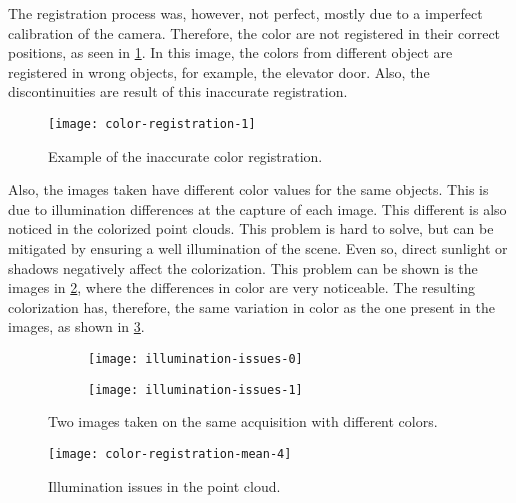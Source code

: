 The registration process was, however, not perfect, mostly due to a imperfect calibration of the camera. Therefore, the color are not registered in their correct positions, as seen in \cref{figure:wrong-registration-photocopy}. In this image, the colors from different object are registered in wrong objects, for example, the elevator door. Also, the discontinuities are result of this inaccurate registration.

\begin{figure}[h]
    
    \centering
    \texttt{[image: color-registration-1]}

    \caption{Example of the inaccurate color registration.}
    \label{figure:wrong-registration-photocopy}
\end{figure}

Also, the images taken have different color values for the same objects. This is due to illumination differences at the capture of each image. This different is also noticed in the colorized point clouds. This problem is hard to solve, but can be mitigated by ensuring a well illumination of the scene. Even so, direct sunlight or shadows negatively affect the colorization. This problem can be shown is the images in \cref{figure:illumination-issues-images}, where the differences in color are very noticeable. The resulting colorization has, therefore, the same variation in color as the one present in the images, as shown in \cref{figure:illumination-issues-pointcloud}.

\begin{figure}[h]
    
    \centering
    \begin{subfigure}{0.5\textwidth}
        \centering
        \texttt{[image: illumination-issues-0]}
    \end{subfigure}%
    \begin{subfigure}{0.5\textwidth}
        \centering
        \texttt{[image: illumination-issues-1]}
    \end{subfigure}%

    \caption{Two images taken on the same acquisition with different colors.}
    \label{figure:illumination-issues-images}

\end{figure}

\begin{figure}[h]
    
    \centering
    \texttt{[image: color-registration-mean-4]}

    \caption{Illumination issues in the point cloud.}
    \label{figure:illumination-issues-pointcloud}

\end{figure}


